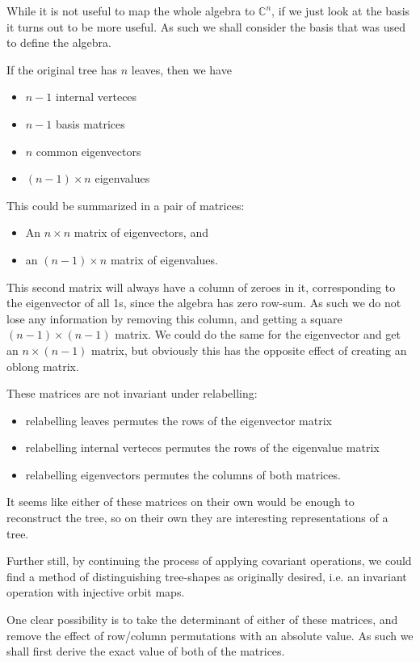\documentclass[10pt,a4paper]{report}
\newcommand{\C}{\mathbb{C}}
\begin{document}
While it is not useful to map the whole algebra to $\C^n$, if we just
look at the basis it turns out to be more useful.
As such we shall consider the basis that was used to define the algebra.

If the original tree has $n$ leaves, then we have
\begin{itemize}
	\item $n-1$ internal verteces
	\item $n-1$ basis matrices
	\item $n$ common eigenvectors
	\item $(n-1) \times n$ eigenvalues
\end{itemize}

This could be summarized in a pair of matrices:
\begin{itemize}
	\item An $n \times n$ matrix of eigenvectors, and
	\item an $(n-1) \times n$ matrix of eigenvalues.
\end{itemize}

This second matrix will always have a column of zeroes in it, corresponding to
the eigenvector of all 1s, since the algebra has zero row-sum.
As such we do not lose any information by removing this column, and getting a
square $(n-1) \times (n-1)$ matrix.
We could do the same for the eigenvector and get an $n \times (n-1)$ matrix,
but obviously this has the opposite effect of creating an oblong matrix.

These matrices are not invariant under relabelling:
\begin{itemize}
	\item relabelling leaves permutes the rows of the eigenvector matrix
	\item relabelling internal verteces permutes the rows of the eigenvalue matrix
	\item relabelling eigenvectors permutes the columns of both matrices.
\end{itemize}

It seems like either of these matrices on their own would be enough to
reconstruct the tree, so on their own they are interesting representations of a tree.

Further still, by continuing the process of applying covariant operations, we could find a method of distinguishing tree-shapes as originally desired, i.e. an invariant operation with injective orbit maps.

One clear possibility is to take the determinant of either of these matrices,
and remove the effect of row/column permutations with an absolute value.
As such we shall first derive the exact value of both of the matrices.
\end{document}
